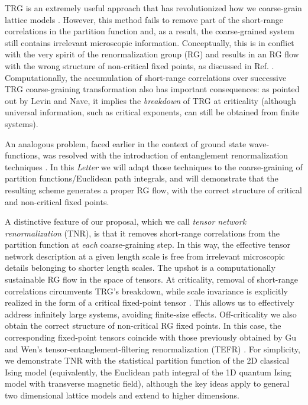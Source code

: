 \documentclass[aps,prl,twocolumn,showpacs,superscriptaddress,floatfix,10pt]{revtex4-1}
\begin{document}
TRG is an extremely useful approach that has revolutionized how we coarse-grain lattice models \cite{TRG,TRGenv,SRG, TEFR, TRGplus, HOTRG,TRG3D}. However, this method fails to remove part of the short-range correlations in the partition function and, as a result, the coarse-grained system still contains irrelevant microscopic information. Conceptually, this is in conflict with the very spirit of the renormalization group (RG) and results in an RG flow with the wrong structure of non-critical fixed points, as discussed in Ref. \cite{TEFR}. Computationally, the accumulation of short-range correlations over successive TRG coarse-graining transformation also has important consequences: as pointed out by Levin and Nave, it implies the \textit{breakdown} of TRG at criticality \cite{TRG, breakdown} (although universal information, such as critical exponents, can still be obtained from finite systems).

An analogous problem, faced earlier in the context of ground state wave-functions, was resolved with the introduction of entanglement renormalization techniques \cite{ER,Algorithms}. In this \textit{Letter} we will adapt those techniques to the coarse-graining of partition functions/Euclidean path integrals, and will demonstrate that the resulting scheme generates a proper RG flow, with the correct structure of critical and non-critical fixed points. 

A distinctive feature of our proposal, which we call \textit{tensor network renormalization} (TNR), is that it removes short-range correlations from the partition function at \textit{each} coarse-graining step. In this way, the effective tensor network description at a given length scale is free from irrelevant microscopic details belonging to shorter length scales. The upshot is a computationally sustainable RG flow in the space of tensors. At criticality, removal of short-range correlations circumvents TRG's breakdown, while scale invariance is explicitly realized in the form of a critical fixed-point tensor \cite{fixedpoint}. This allows us to effectively address infinitely large systems, avoiding finite-size effects. Off-criticality we also obtain the correct structure of non-critical RG fixed points. In this case, the corresponding fixed-point tensors coincide with those previously obtained by Gu and Wen's tensor-entanglement-filtering renormalization (TEFR) \cite{TEFR, filterCDL}. For simplicity, we demonstrate TNR with the statistical partition function of the 2D classical Ising model (equivalently, the Euclidean path integral of the 1D quantum Ising model with transverse magnetic field), although the key ideas apply to general two dimensional lattice models and extend to higher dimensions.
\end{document}

